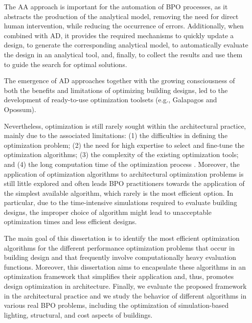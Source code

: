 	The \ac{AA} approach is important for the automation of \ac{BPO} processes, as it abstracts the production of the analytical model, removing the need for direct human intervention, while reducing the occurrence of errors. Additionally, when combined with \ac{AD}, it provides the required mechanisms to quickly update a design, to generate the corresponding analytical model, to automatically evaluate the design in an analytical tool, and, finally, to collect the results and use them to guide the search for optimal solutions. 

	The emergence of \ac{AD} approaches together with the growing consciousness of both the benefits and limitations of optimizing building designs, led to the development of ready-to-use optimization toolsets (e.g., Galapagos and Opossum). 
		
	Nevertheless, optimization is still rarely sought within the architectural practice, mainly due to the associated limitations: (1) the difficulties in defining the optimization problem; (2) the need for high expertise to select and fine-tune the optimization algorithms; (3) the complexity of the existing optimization tools; and (4) the long computation time of the optimization process \cite{Attia2013,Nguyen2014}. Moreover, the application of optimization algorithms to architectural optimization problems is still little explored and often leads \ac{BPO} practitioners towards the application of the simplest available algorithm, which rarely is the most efficient option. In particular, due to the time-intensive simulations required to evaluate building designs, the improper choice of algorithm might lead to unacceptable optimization times and less efficient designs. 

	The main goal of this dissertation is to identify the most efficient optimization algorithms for the different performance optimization problems that occur in building design and that frequently involve computationally heavy evaluation functions. Moreover, this dissertation aims to encapsulate these algorithms in an optimization framework that simplifies their application and, thus, promotes design optimization in architecture. Finally, we evaluate the proposed framework in the architectural practice and we study the behavior of different algorithms in various real \ac{BPO} problems, including the optimization of simulation-based lighting, structural, and cost aspects of buildings. 